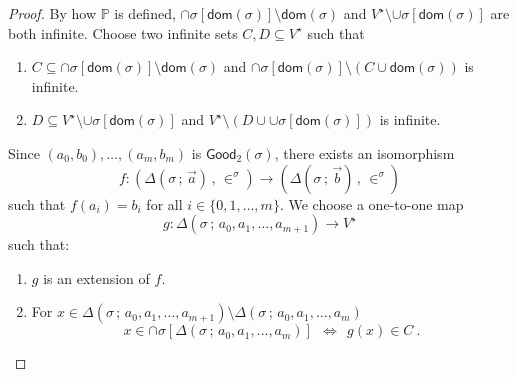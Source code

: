 \documentclass[10pt,a4paper, openany,  oldfontcommands]{memoir}
\newtheorem{open problem} [theorem] {Open Problem}
\begin{document}
\begin{proof}
 
  By how $  \mathbb{P} $ is defined,  
  $   \cap    \sigma  \left[   \mathsf{dom} \left(  \sigma  \right)    \right]    \setminus  \mathsf{dom} \left(  \sigma  \right)  $
 and    $ V^{  \star }  \setminus   \cup    \sigma  \left[   \mathsf{dom} \left(  \sigma  \right)    \right]    $
 are both infinite. 
 Choose two infinite sets   $  C,   D   \subseteq  V^{  \star }  $  such that  
 \begin{enumerate}
\item   $  C  \subseteq   \cap    \sigma  \left[   \mathsf{dom} \left(  \sigma  \right)    \right]     \setminus    \mathsf{dom} \left(  \sigma  \right)   $  
and 
 $   \cap    \sigma  \left[   \mathsf{dom} \left(  \sigma  \right)    \right]      \setminus       \left(  C  \cup    \mathsf{dom} \left(  \sigma  \right)    \right) $ 
is infinite. 
 
 
 \item   $  D  \subseteq    V^{  \star }  \setminus   \cup    \sigma  \left[   \mathsf{dom} \left(  \sigma  \right)    \right]       $  
and  $   V^{  \star }  \setminus   \left(  D  \cup   \cup    \sigma  \left[   \mathsf{dom} \left(  \sigma  \right)    \right]     \right)   $ 
is infinite. 
 \end{enumerate}
Since     $  \left( a_0, b_0  \right),    \ldots , \left( a_m, b_m  \right) $     is  $ \mathsf{Good}_2 \left(   \sigma  \right)    $, 
there exists an isomorphism 
    \[
f :       \left(  \Delta  \left(  \sigma  \,  ;  \,     \vec{a}  \right)    \,  ,   \,  \in^{   \sigma   }    \right)       \to   
      \left(   \Delta      \left(   \sigma     \,  ;  \,    \vec{b}     \right)   \,  ,   \,  \in^{   \sigma   }    \right)  
      \]
  such that        $  f (  a_i ) =  b_i  $ for  all   $ i  \in  \lbrace 0, 1,  \ldots , m  \rbrace $. 
We choose   a one-to-one map 
\[
g :     \Delta  \left(  \sigma  \,  ;  \,     a_0, a_1,  \ldots , a_{ m+1}   \right)     \to   V^{  \star }  
\]
such that: 
\begin{enumerate}
\item  $g$ is an extension of   $  f $. 


\item For  $  x  \in   \Delta  \left(  \sigma  \,  ;  \,     a_0, a_1,  \ldots , a_{ m+1}   \right)    \setminus  
 \Delta  \left(  \sigma  \,  ;  \,     a_0, a_1,  \ldots , a_{ m}   \right)   $
\[
x   \in  \cap   \sigma  \left[   \Delta  \left(  \sigma  \,  ;  \,     a_0, a_1,  \ldots , a_{ m}   \right)    \right]  
\     \       \Leftrightarrow        \         \   
g(x)    \in   C
\        .
\]






\end{enumerate}
\end{proof}
\end{document}
